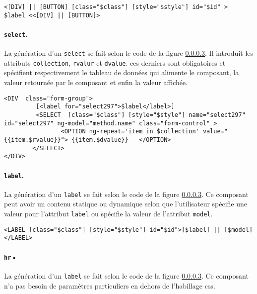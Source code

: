 \documentclass[a4paper,11pt]{report}
\begin{document}
\begin{verbatim}
<[DIV] || [BUTTON] [class="$class"] [style="$style"] id="$id" >  $label <<[DIV] || [BUTTON]>
\end{verbatim}

\paragraph{{\tt select}.} La génération d'un {\tt select} se fait selon le code de la figure \ref{}. Il introduit les attributs {\tt collection}, {\tt rvalur}
et {\tt dvalue}. ces derniers sont obligatoires et spécifient  respectivement le tableau de données qui alimente le composant, la valeur retournée 
par le composant et enfin la valeur affichée. 

\begin{verbatim}
<DIV  class="form-group">
    	 [<label for="select297">$label</label>]
         <SELECT  [class="$class"] [style="$style"] name="select297" id="select297" ng-model="method.name" class="form-control" >
         		<OPTION ng-repeat='item in $collection' value="{{item.$rvalue}}"> {{item.$dvalue}} 	 </OPTION>
        </SELECT>
</DIV>
\end{verbatim} 

\paragraph{{\tt label}.} La génération d'un {\tt label} se fait selon le code de la figure \ref{}. Ce composant peut avoir un contenu
statique ou dynamique selon que l'utilisateur spécifie une valeur pour l'attribut {\tt label} ou spécifie la valeur de l'attribut {\tt model}.

\begin{verbatim}
<LABEL [class="$class"] [style="$style"] id="$id">[$label] || [$model] </LABEL>
\end{verbatim}
\paragraph{{\tt hr}•} La génération d'un {\tt label} se fait selon le code de la figure \ref{}. Ce composant n'a pas besoin de paramètres
particuliers en dehors de l'habillage css.
\end{document}
